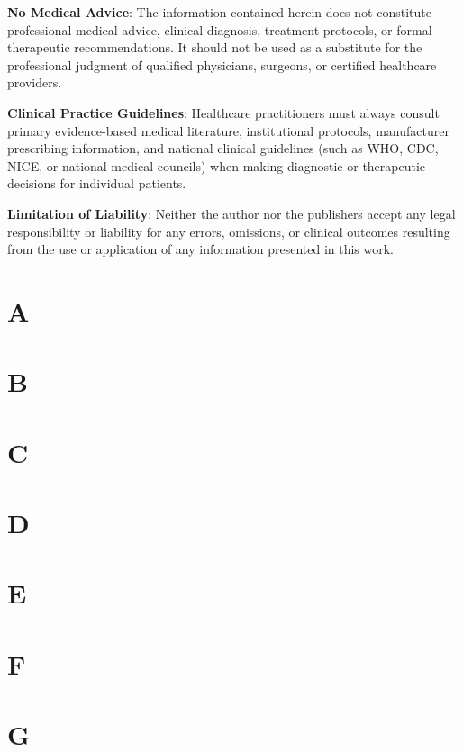 \documentclass[11pt,twocolumn,twoside]{book}
\newcommand{\1}{\ifmmode\mathbin{\%}\else\%\fi}
\begin{document}
\medskip

\noindent \textbf{No Medical Advice}: The information contained herein does not constitute professional medical advice, clinical diagnosis, treatment protocols, or formal therapeutic recommendations. It should not be used as a substitute for the professional judgment of qualified physicians, surgeons, or certified healthcare providers.

\medskip

\noindent \textbf{Clinical Practice Guidelines}: Healthcare practitioners must always consult primary evidence-based medical literature, institutional protocols, manufacturer prescribing information, and national clinical guidelines (such as WHO, CDC, NICE, or national medical councils) when making diagnostic or therapeutic decisions for individual patients.

\medskip

\noindent \textbf{Limitation of Liability}: Neither the author nor the publishers accept any legal responsibility or liability for any errors, omissions, or clinical outcomes resulting from the use or application of any information presented in this work.

\newpage
\twocolumn
\mainmatter
\setcounter{tocdepth}{0}




\chapter{A}

\chapter{B}

\chapter{C}

\chapter{D}

\chapter{E}

\chapter{F}

\chapter{G}

\end{document}
